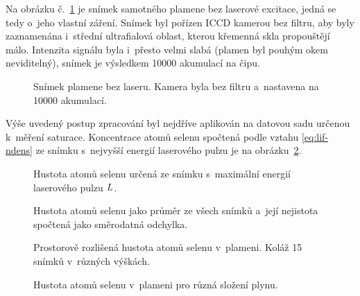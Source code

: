 Na obrázku č.~\ref{fig:lif-flame} je snímek samotného plamene bez laserové
excitace, jedná se tedy o~jeho vlastní záření.
Snímek byl pořízen ICCD kamerou bez filtru, aby byly zaznamenána i~střední
ultrafialová oblast, kterou křemenná skla propouštějí málo.
Intenzita signálu byla i~přesto velmi slabá
(plamen byl pouhým okem neviditelný),
snímek je výsledkem \num{10000} akumulací na čipu.

\begin{figure}[htp]
	\centering
	
	\caption{Snímek plamene bez laseru.
		Kamera byla bez filtru a~nastavena na \num{10000} akumulací.}
	\label{fig:lif-flame}
\end{figure}

Výše uvedený postup zpracování byl nejdříve aplikován na datovou sadu
určenou k~měření saturace.
Koncentrace atomů selenu spočtená podle vztahu \eqref{eq:lif-ndens}
ze snímku s~nejvyšší energií laserového pulzu je
na obrázku~\ref{fig:lif-concentration-single}.

\begin{figure}[htp]
	\centering
	
	\caption{Hustota atomů selenu určená ze snímku
		s~maximální energií laserového pulzu $L$.}
	\label{fig:lif-concentration-single}
\end{figure}

\begin{figure}[htp]
	\centering
	
	
	\caption{Hustota atomů selenu jako průměr ze všech snímků
		a~její nejistota spočtená jako směrodatná odchylka.}
	\label{fig:lif-concentration-mean}
\end{figure}

\begin{figure}[htp]
	\centering
	
	\caption{Prostorově rozlišená hustota atomů selenu v~plameni.
		Koláž 15 snímků v~různých výškách.}
	\label{fig:lif-vertical-concentration-700+300}
\end{figure}

\begin{figure}[htp]
	\centering
	
	\caption{Hustota atomů selenu v~plameni pro různá složení plynu.}
	\label{fig:lif-vertical-concentration-compositions}
\end{figure}
